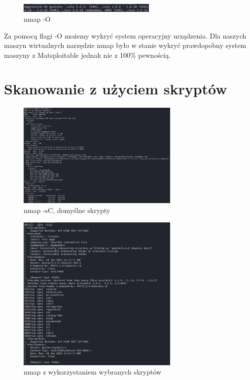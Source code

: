 \documentclass{article}
\begin{document}
\begin{figure}[H]
  \centering
  \includegraphics[width=0.6\textwidth]{nmap_os_matplot.png}
  \caption{nmap -O}
\end{figure}

Za pomocą flagi -O możemy wykryć system operacyjny urządzenia. Dla naszych maszyn wirtualnych narzędzie nmap było w stanie wykryć prawdopobny system maszyny z Matsploitable jednak nie z 100\% pewnością.

\section*{Skanowanie z użyciem skryptów}

\begin{figure}[H]
  \centering
  \includegraphics[width=0.7\textwidth]{nmap_sc.png}
  \caption{nmap -sC, domyślne skrypty}
\end{figure}

\begin{figure}[H]
  \centering
  \includegraphics[width=0.7\textwidth]{http_meta_headers.png}
  \caption{nmap z wykorzystaniem wybranych skryptów}
\end{figure}
\end{document}
